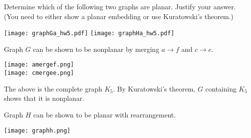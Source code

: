 
\begin{problem}
Determine which of the following two graphs are planar.
Justify your answer. (You need to either show a planar embedding or
use Kuratowski's theorem.)

	\begin{center}
		\texttt{[image: graphGa\_hw5.pdf]}
		\hfill
		\texttt{[image: graphHa\_hw5.pdf]}
	\end{center}

\end{problem}

\begin{solution}
Graph $G$ can be shown to be nonplanar by merging $a\to f$ and $c\to e$.

\begin{center}
  \texttt{[image: amergef.png]} \\
  \texttt{[image: cmergee.png]}
  \end{center}

The above is the complete graph $K_5$. By Kuratowski's theorem, $G$ containing $K_5$ shows that it is nonplanar.

\bigskip
\bigskip
\bigskip

Graph $H$ can be shown to be planar with rearrangement.

\begin{center}
		\texttt{[image: graphh.png]}
\end{center}

\end{solution}



